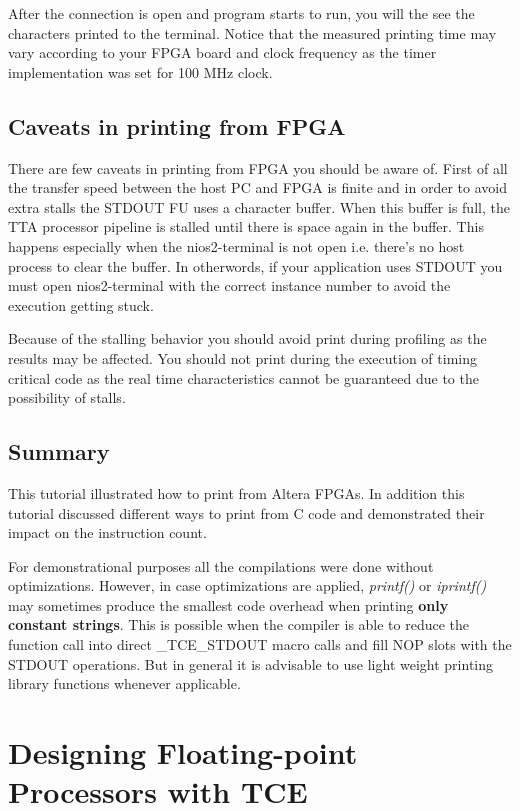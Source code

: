 \documentclass[twoside]{tceusermanual}
\begin{document}

After the connection is open and program starts to run, you will the
see the characters printed to the terminal. Notice that the measured
printing time may vary according to your FPGA board and clock
frequency as the timer implementation was set for 100 MHz clock.

\subsection{Caveats in printing from FPGA}

There are few caveats in printing from FPGA you should be aware
of. First of all the transfer speed between the host PC and FPGA is
finite and in order to avoid extra stalls the STDOUT FU uses a
character buffer. When this buffer is full, the TTA processor pipeline
is stalled until there is space again in the buffer. This happens
especially when the nios2-terminal is not open i.e. there's no host
process to clear the buffer. In otherwords, if your application uses
STDOUT you must open nios2-terminal with the correct instance number
to avoid the execution getting stuck.

Because of the stalling behavior you should avoid print during
profiling as the results may be affected. You should not print during
the execution of timing critical code as the real time characteristics
cannot be guaranteed due to the possibility of stalls.


\subsection{Summary}

This tutorial illustrated how to print from Altera FPGAs. In addition
this tutorial discussed different ways to print from C code and
demonstrated their impact on the instruction count.

For demonstrational purposes all the compilations were done without
optimizations. However, in case optimizations are applied,
\textit{printf()} or \textit{iprintf()} may sometimes produce the
smallest code overhead when printing \textbf{only constant strings}.
This is possible when the compiler is able to reduce the function call
into direct \_TCE\_STDOUT macro calls and fill NOP slots with the
STDOUT operations. But in general it is advisable to use light weight
printing library functions whenever applicable.


\section{Designing Floating-point Processors with TCE}
\end{document}
